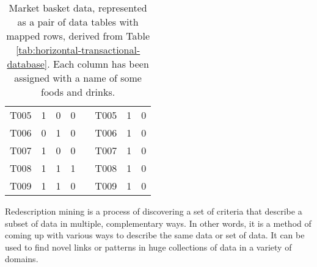 \begin{table}[tb]
{\begin{tabular}{|llll|l|lll|}
            \multicolumn{1}{|l|}{T005}           & \multicolumn{1}{l|}{\cellcolor[HTML]{9AFF99}1} & \multicolumn{1}{l|}{\cellcolor[HTML]{FFCCC9}0} & \cellcolor[HTML]{FFCCC9}0 &  & \multicolumn{1}{l|}{T005}           & \multicolumn{1}{l|}{\cellcolor[HTML]{9AFF99}1} & \cellcolor[HTML]{FFCCC9}0 \\ \cline{1-4} \cline{6-8} 
            \multicolumn{1}{|l|}{T006}           & \multicolumn{1}{l|}{\cellcolor[HTML]{FFCCC9}0} & \multicolumn{1}{l|}{\cellcolor[HTML]{9AFF99}1} & \cellcolor[HTML]{FFCCC9}0 &  & \multicolumn{1}{l|}{T006}           & \multicolumn{1}{l|}{\cellcolor[HTML]{9AFF99}1} & \cellcolor[HTML]{FFCCC9}0 \\ \cline{1-4} \cline{6-8} 
            \multicolumn{1}{|l|}{T007}           & \multicolumn{1}{l|}{\cellcolor[HTML]{9AFF99}1} & \multicolumn{1}{l|}{\cellcolor[HTML]{FFCCC9}0} & \cellcolor[HTML]{FFCCC9}0 &  & \multicolumn{1}{l|}{T007}           & \multicolumn{1}{l|}{\cellcolor[HTML]{9AFF99}1} & \cellcolor[HTML]{FFCCC9}0 \\ \cline{1-4} \cline{6-8} 
            \multicolumn{1}{|l|}{T008}           & \multicolumn{1}{l|}{\cellcolor[HTML]{9AFF99}1} & \multicolumn{1}{l|}{\cellcolor[HTML]{9AFF99}1} & \cellcolor[HTML]{9AFF99}1 &  & \multicolumn{1}{l|}{T008}           & \multicolumn{1}{l|}{\cellcolor[HTML]{9AFF99}1} & \cellcolor[HTML]{FFCCC9}0 \\ \cline{1-4} \cline{6-8} 
            \multicolumn{1}{|l|}{T009}           & \multicolumn{1}{l|}{\cellcolor[HTML]{9AFF99}1} & \multicolumn{1}{l|}{\cellcolor[HTML]{9AFF99}1} & \cellcolor[HTML]{FFCCC9}0 &  & \multicolumn{1}{l|}{T009}           & \multicolumn{1}{l|}{\cellcolor[HTML]{9AFF99}1} & \cellcolor[HTML]{FFCCC9}0 \\ \cline{1-4} \cline{6-8} 
        \end{tabular}%
    }
    \caption{Market basket data, represented as a pair of data tables with mapped rows, derived from Table \ref{tab:horizontal-transactional-database}. Each column has been assigned with a name of some foods and drinks.}
    \label{tab:market-basket-redescription}
\end{table}

Redescription mining is a process of discovering a set of criteria that describe a subset of data in multiple, complementary ways.
In other words, it is a method of coming up with various ways to describe the same data or set of data.
It can be used to find novel links or patterns in huge collections of data in a variety of domains.

